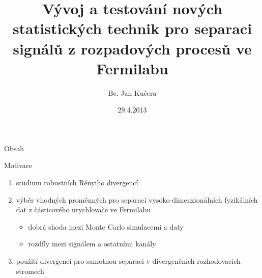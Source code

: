 \documentclass[11pt]{beamer}
\author{Bc. Jan Kučera}
\title{Vývoj a testování nových statistických technik pro separaci signálů z rozpadových procesů ve Fermilabu}
\institute{FJFI, ČVUT\\ $\quad$ $\quad$ $\quad$ \\ Vedoucí práce: Ing. Václav Kůs Ph.D.}
\date{29.4.2013}
\begin{document}
\begin{frame}
	\maketitle
\end{frame}

\begin{frame}{Obsah}
    	\tableofcontents
\end{frame}

%

\begin{frame}
Motivace
\begin{enumerate}


\item studium robustních Rényiho divergencí
\item výběr vhodných proměnných pro separaci vysoko-dimenzionálních fyzikálních dat z částicového urychlovače ve Fermilabu
\begin{itemize}
	\item dobrá shoda mezi Monte Carlo simulacemi a daty
	\item rozdíly mezi signálem a ostatními kanály
\end{itemize}
\item použití divergencí pro samotnou separaci v divergenčních rozhodovacích stromech
\end{enumerate}
\end{frame}
\end{document}
